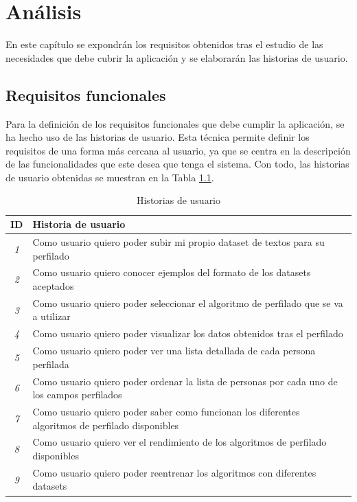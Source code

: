 \chapter{Análisis}
\label{chap:analisis}

En este capítulo se expondrán los requisitos obtenidos tras el estudio de las necesidades que debe cubrir la aplicación
y se elaborarán las historias de usuario.

\section{Requisitos funcionales}
\label{sec:analisis_requisitos_funcionales}

Para la definición de los requisitos funcionales que debe cumplir la aplicación, se ha hecho uso de las historias de usuario.
Esta técnica permite definir los requisitos de una forma más cercana al usuario, ya que se centra en la descripción
de las funcionalidades que este desea que tenga el sistema. Con todo, las historias de usuario obtenidas se muestran en la
Tabla \ref{tab:historias_usuario}.

\bigskip
\begin{table}[H]
  \centering
  \begin{tabular}{|c|p{11cm}|}
		\rowcolor{udcpink!25}
		\hline
		\small \textbf{ID} & \small \textbf{Historia de usuario} \\\hline
		\small \textit{1} & \small Como usuario quiero poder subir mi propio dataset de textos para su perfilado \\ \hline
		\small \textit{2} & \small Como usuario quiero conocer ejemplos del formato de los datasets aceptados \\ \hline
		\small \textit{3} & \small Como usuario quiero poder seleccionar el algoritmo de perfilado que se va a utilizar \\ \hline
		\small \textit{4} & \small Como usuario quiero poder visualizar los datos obtenidos tras el perfilado \\ \hline
		\small \textit{5} & \small Como usuario quiero poder ver una lista detallada de cada persona perfilada \\ \hline
		\small \textit{6} & \small Como usuario quiero poder ordenar la lista de personas por cada uno de los campos perfilados \\ \hline
		\small \textit{7} & \small Como usuario quiero poder saber como funcionan los diferentes algoritmos de perfilado disponibles \\ \hline
		\small \textit{8} & \small Como usuario quiero ver el rendimiento de los algoritmos de perfilado disponibles \\ \hline
		\small \textit{9} & \small Como usuario quiero poder reentrenar los algoritmos con diferentes datasets \\ \hline
  \end{tabular}
  \caption{Historias de usuario}
  \label{tab:historias_usuario}
\end{table}

